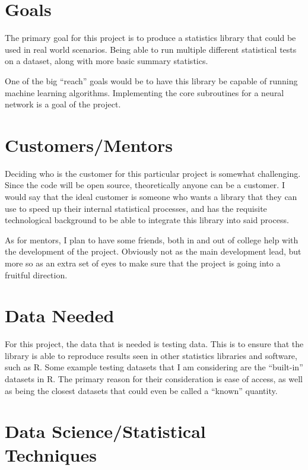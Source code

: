 \documentclass{article}
\begin{document}
\section{Goals}

The primary goal for this project is to produce a statistics library that
could be used in real world scenarios. Being able to run multiple different
statistical tests on a dataset, along with more basic summary statistics.

One of the big ``reach'' goals would be to have this library be capable of
running machine learning algorithms. Implementing the core subroutines for
a neural network is a goal of the project.

\section{Customers/Mentors}

Deciding who is the customer for this particular project is somewhat challenging.
Since the code will be open source, theoretically anyone can be a customer.
I would say that the ideal customer is someone who wants a library that they
can use to speed up their internal statistical processes, and has the requisite
technological background to be able to integrate this library into said process.

As for mentors, I plan to have some friends, both in and out of college help
with the development of the project. Obviously not as the main development lead,
but more so as an extra set of eyes to make sure that the project is going into
a fruitful direction.

\section{Data Needed}

For this project, the data that is needed is testing data. This is to ensure
that the library is able to reproduce results seen in other statistics
libraries and software, such as R. Some example testing datasets that I am
considering are the ``built-in'' datasets in R. The primary reason for their
consideration is ease of access, as well as being the closest datasets that
could even be called a ``known'' quantity.

\section{Data Science/Statistical Techniques}
\end{document}

